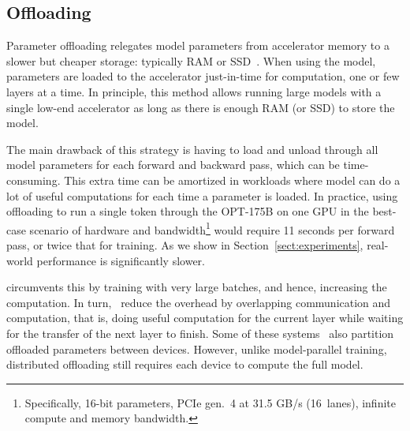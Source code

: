 \subsection{Offloading}\label{sect:offload}
Parameter offloading relegates model parameters from accelerator memory to a slower but cheaper storage: typically RAM or SSD~\citep{l2l,zerooffload,zero_ssd}\nocite{accelerate}. When using the model, parameters are loaded to the accelerator just-in-time for computation, one or few layers at a time. In principle, this method allows running large models with a single low-end accelerator as long as there is enough RAM (or SSD) to store the model.

The main drawback of this strategy is having to load and unload through all model parameters for each forward and backward pass, which can be time-consuming. This extra time can be amortized in workloads where model can do a lot of useful computations for each time a parameter is loaded. 
In practice, using offloading to run a single token through the OPT-175B on one GPU in the best-case scenario of hardware and bandwidth\footnote{Specifically, 16-bit parameters, PCIe gen.~4 at 31.5 GB/s (16~lanes), infinite compute and memory bandwidth.} would require 11 seconds per forward pass, or twice that for training. As we show in Section~\ref{sect:experiments}, real-world performance is significantly slower.

\citet{l2l} circumvents this by training with very large batches, and hence, increasing the computation. In turn,~\citet{zerooffload,zero_ssd} reduce the overhead by overlapping communication and computation, that is, doing useful computation for the current layer while waiting for the transfer of the next layer to finish. Some of these systems~\citet{zerooffload} also partition offloaded parameters between devices. However, unlike model-parallel training, distributed offloading still requires each device to compute the full model.
